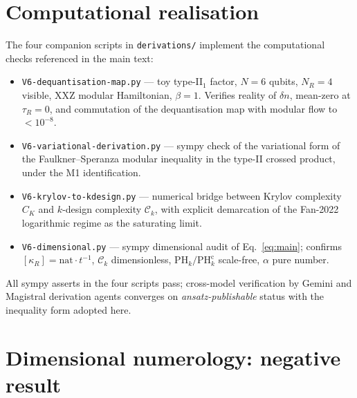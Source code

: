 \documentclass[aps,prd,superscriptaddress,nofootinbib,floatfix,10pt]{revtex4-2}
\theoremstyle{remark}
\newcommand{\tauR}{\tau_{R}}
\newcommand{\kR}{\kappa_{R}}
\newcommand{\Ck}{\mathcal{C}_{k}}
\newcommand{\PHk}{\mathrm{PH}_{k}}
\newcommand{\dn}{\delta n}
\begin{document}
\appendix

\section{Computational realisation}
\label{app:computation}

The four companion scripts in \texttt{derivations/} implement the
computational checks referenced in the main text:
\begin{itemize}[leftmargin=2em,itemsep=2pt]
 \item \texttt{V6-dequantisation-map.py} --- toy type-II$_{1}$
   factor, $N=6$ qubits, $N_{R}=4$ visible, XXZ modular Hamiltonian,
   $\beta=1$. Verifies reality of $\dn$, mean-zero at $\tauR=0$, and
   commutation of the dequantisation map with modular flow to
   $<10^{-8}$.
 \item \texttt{V6-variational-derivation.py} --- sympy check of the
   variational form of the Faulkner--Speranza modular inequality in
   the type-II crossed product, under the M1 identification.
 \item \texttt{V6-krylov-to-kdesign.py} --- numerical bridge between
   Krylov complexity $C_{K}$ and $k$-design complexity $\Ck$, with
   explicit demarcation of the Fan-2022 logarithmic regime as the
   saturating limit.
 \item \texttt{V6-dimensional.py} --- sympy dimensional audit of
   Eq.~\eqref{eq:main}; confirms $[\kR]=\mathrm{nat}\cdot t^{-1}$,
   $\Ck$ dimensionless, $\PHk/\PHk^{\mathrm{c}}$ scale-free, $\alpha$
   pure number.
\end{itemize}
All sympy asserts in the four scripts pass; cross-model verification
by Gemini and Magistral derivation agents converges on
\emph{ansatz-publishable} status with the inequality form adopted here.

\section{Dimensional numerology: negative result}
\label{app:numerology}
\end{document}
